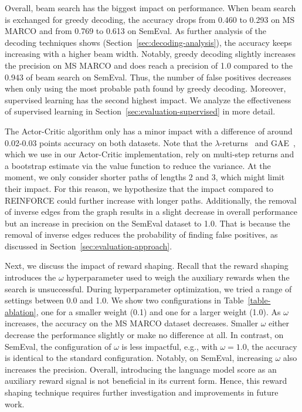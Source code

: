 Overall, beam search has the biggest impact on performance. When beam search 
is exchanged for greedy decoding, the accuracy drops from 0.460 to 0.293 on 
MS MARCO and from 0.769 to 0.613 on SemEval. As further analysis of the decoding techniques shows (Section~\ref{sec:decoding-analysis}), 
the accuracy keeps increasing with a higher beam width.
Notably, greedy decoding slightly increases the precision on MS MARCO and does reach a precision of 1.0 compared 
to the 0.943 of beam search on SemEval.
Thus, the number of false positives decreases when only using the most probable path found by greedy decoding.
Moreover, supervised learning has the second highest impact. We analyze the effectiveness of supervised learning in Section~\ref{sec:evaluation-supervised} in more detail.

The Actor-Critic algorithm only has a minor 
impact with a difference of around 0.02-0.03 points accuracy on both datasets. Note that the $\lambda$-returns~\cite{Sutton1998RL} and GAE~\cite{Schulman2016GAE}, which we use in our Actor-Critic implementation, 
rely on multi-step returns and a bootstrap estimate via the value function to reduce the variance. At the moment, we only consider shorter paths 
of lengths 2 and 3, which might limit their impact. For this reason, we hypothesize that the impact 
compared to REINFORCE could further increase with longer paths.
Additionally, the removal of inverse edges from the graph results in a slight decrease in overall performance but an increase in precision on the SemEval dataset to 1.0. 
That is because the removal of inverse edges reduces the probability of finding false positives, as discussed in Section~\ref{sec:evaluation-approach}.

Next, we discuss the impact of reward shaping. 
Recall that the reward shaping introduces the $\omega$ hyperparameter used to weigh the auxiliary rewards when the search is unsuccessful.
During hyperparameter optimization, we tried a range of settings between 0.0 and 1.0.
We show two configurations in Table~\ref{table-ablation}, one for a smaller weight (0.1) and one for a
larger weight (1.0). 
As $\omega$ increases, the accuracy on the MS MARCO dataset decreases.
Smaller $\omega$ either decrease the performance slightly or make no difference at all.
In contrast, on SemEval, the configuration of $\omega$ is less impactful, e.g., with $\omega = 1.0$, the accuracy is identical to the standard configuration.
Notably, on SemEval, increasing $\omega$ also increases the precision.
Overall, introducing the language model score as an auxiliary reward signal 
is not beneficial in its current form.
Hence, this reward shaping technique requires further investigation and improvements 
in future work.

